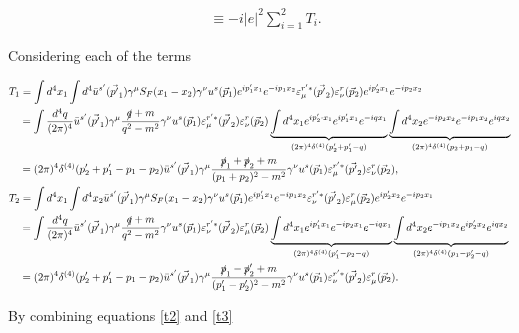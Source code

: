\begin{example}
\begin{footnotesize}
\begin{equation}
\begin{split}
			&\equiv-i|e|^2\sum_{i=1}^{2}T_i.
		\end{split}
		\label{t2}
	\end{equation} 
\end{footnotesize}	
	Considering each of the terms
	\begin{footnotesize}
	 \begin{equation}
		\begin{split}
			&T_1=\int d^4x_1\int d^4
			\bar{u}^{s'}(\vec{p'}_1)\gamma^\mu S_{F}(x_1-x_2)\gamma^\nu u^s(\vec{p}_1)e^{ip'_1 x_1}e^{-ip_1 x_2}\varepsilon_\mu^{r'*}(\vec{p'}_2)\varepsilon_\nu^{r}(\vec{p}_2)e^{ip'_2 x_1}e^{-ip_2 x_2}\\
			&\quad=\int \frac{d^4q}{(2\pi)^4}
			\bar{u}^{s'}(\vec{p'}_1)\gamma^\mu \frac{\slashed q+m}{q^2-m^2}\gamma^\nu u^s(\vec{p}_1)\varepsilon_\mu^{r'*}(\vec{p'}_2)\varepsilon_\nu^{r}(\vec{p}_2)
			\underbrace{\int d^4x_1
				e^{ip'_2\cdot x_1}e^{ip'_1 x_1}e^{-iq x_1}}_{(2\pi)^4\delta^{(4)}(p'_2+p'_1-q)}
			\underbrace{\int d^4x_2
				e^{-ip_2 x_2}
				e^{-ip_1x_2}e^{iq x_2}}_{(2\pi)^4\delta^{(4)}(p_2+p_1-q)}\\
			&\quad=(2\pi)^4\delta^{(4)}(p'_2+p'_1-p_1-p_2)\bar{u}^{s'}(\vec{p'}_1)\gamma^\mu \frac{\slashed p_1+\slashed p_2+m}{(p_1+p_2)^2-m^2}\gamma^\nu u^s(\vec{p}_1)\varepsilon_\mu^{r'*}(\vec{p'}_2)\varepsilon_\nu^{r}(\vec{p}_2),\\
			&T_2=\int d^4x_1\int d^4x_2
			\bar{u}^{s'}(\vec{p'}_1)\gamma^\mu S_{F}(x_1-x_2)\gamma^\nu u^s(\vec{p}_1)e^{ip'_1 x_1}e^{-ip_1 x_2}
			\varepsilon_\nu^{r'*}(\vec{p'}_2)\varepsilon_\mu^{r}(\vec{p}_2)e^{ip'_2 x_2}e^{-ip_2 x_1}\\
			&\quad=\int \frac{d^4q}{(2\pi)^4}
			\bar{u}^{s'}(\vec{p'}_1)\gamma^\mu \frac{\slashed q+m}{q^2-m^2}\gamma^\nu u^s(\vec{p}_1)
			\varepsilon_\nu^{r'*}(\vec{p'}_2)\varepsilon_\mu^{r}(\vec{p}_2)
			\underbrace{\int d^4x_1
				e^{ip'_1 x_1}e^{-ip_2 x_1}e^{-iqx_1}}_{(2\pi)^4\delta^{(4)}(p'_1-p_2-q)}\underbrace{\int d^4x_2e^{-ip_1 x_2}
				e^{ip'_2 x_2}e^{iq x_2}}_{(2\pi)^4\delta^{(4)}(p_1-p'_2-q)}\\
			&\quad=(2\pi)^4\delta^{(4)}(p'_2+p'_1-p_1-p_2)\bar{u}^{s'}(\vec{p'}_1)\gamma^\mu \frac{\slashed p_1-\slashed p'_2+m}{(p'_1-p'_2)^2-m^2}\gamma^\nu u^s(\vec{p}_1)
			\varepsilon_\nu^{r'*}(\vec{p'}_2)\varepsilon_\mu^{r}(\vec{p}_2).
		\end{split}
		\label{t3}
	\end{equation}
	\end{footnotesize} 
	By combining equations \eqref{t2} and \eqref{t3}
	\begin{footnotesize}

\end{footnotesize}
\end{example}

